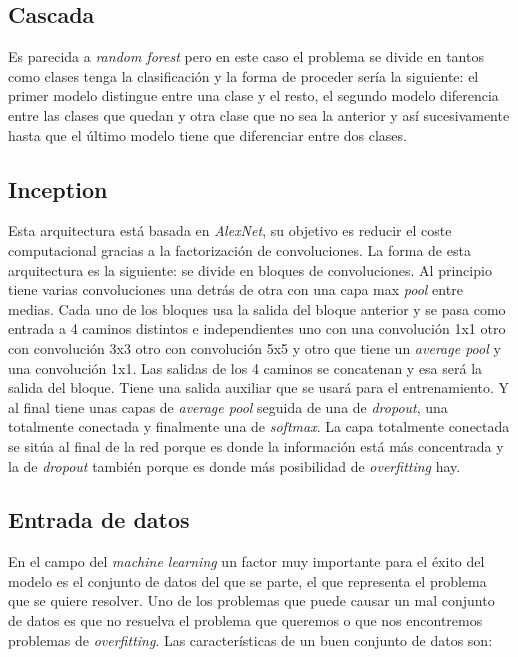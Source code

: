 \documentclass[12pt,a4paper]{article}
\begin{document}
\subsection{Cascada}
Es parecida a \textit{random forest} pero en este caso el problema se divide en tantos como clases tenga la clasificación y la forma de proceder sería la siguiente: el primer modelo distingue entre una clase y el resto, el segundo modelo diferencia entre las clases que quedan y otra clase que no sea la anterior y así sucesivamente hasta que el último modelo tiene que diferenciar entre dos clases.

\subsection{Inception}
Esta arquitectura está basada en \textit{AlexNet}, su objetivo es reducir el coste computacional gracias a la factorización de convoluciones. La forma de esta arquitectura es la siguiente: se divide en bloques de convoluciones. Al principio tiene varias convoluciones una detrás de otra con una capa max \textit{pool} entre medias. Cada uno de los bloques usa la salida del bloque anterior y se pasa como entrada a 4 caminos distintos e independientes uno con una convolución 1x1 otro con convolución 3x3 otro con convolución 5x5 y otro que tiene un \textit{average pool} y una convolución 1x1. Las salidas de los 4 caminos se concatenan y esa será la salida del bloque. Tiene una salida auxiliar que se usará para el entrenamiento. Y al final tiene unas capas de \textit{average pool} seguida de una de \textit{dropout}, una totalmente conectada y finalmente una de \textit{softmax}. La capa totalmente conectada se sitúa al final de la red porque es donde la información está más concentrada y la de \textit{dropout} también porque es donde más posibilidad de \textit{overfitting} hay.


\subsection{Entrada de datos}
En el campo del \textit{machine learning} un factor muy importante para el éxito del modelo es el conjunto de datos del que se parte, el que representa el problema que se quiere resolver. Uno de los problemas que puede causar un mal conjunto de datos es que no resuelva el problema que queremos o que nos encontremos problemas de \textit{overfitting}. Las características de un buen conjunto de datos son:
\end{document}
